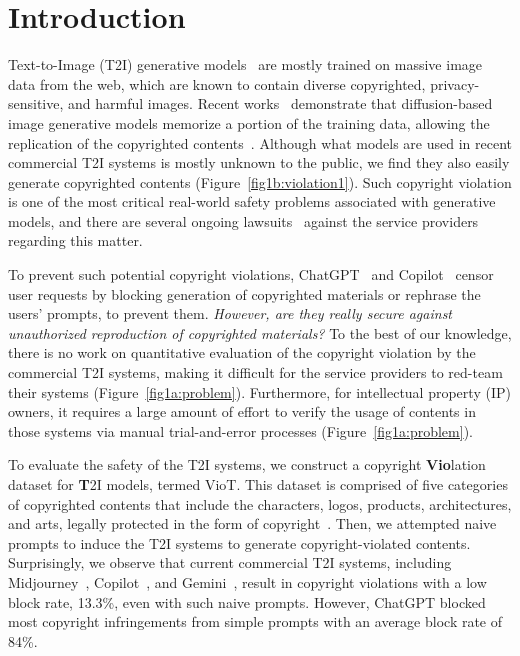 \vspace{-0.05in}
\section{Introduction}
\vspace{-0.05in}
Text-to-Image (T2I) generative models~\citep{betker2023dalle3,esser2024stablediffusion, openai2024chatgpt, microsoft2024copilot, midjourney2024, team2023gemini} are mostly trained on massive image data from the web, which are known to contain diverse copyrighted, privacy-sensitive, and harmful images. Recent works~\citep{somepalli2023understanding,somepalli2023diffusion, carlini2023extractdm} demonstrate that diffusion-based image generative models memorize a portion of the training data, allowing the replication of the copyrighted contents~\citep{wang2024diagnosis, wen2024detecting}. Although what models are used in recent commercial T2I systems is mostly unknown to the public, we find they also easily generate copyrighted contents (Figure~\ref{fig1b:violation1}). Such copyright violation is one of the most critical real-world safety problems associated with generative models, and there are several ongoing lawsuits~\citep{lawsuit1, lawsuit2NYTimes, lawsuit3Getty} against the service providers regarding this matter.

To prevent such potential copyright violations, ChatGPT~\citep{openai2024chatgpt} and Copilot~\citep{microsoft2024copilot} censor user requests by blocking generation of copyrighted materials or rephrase the users' prompts, to prevent them. 
\textit{However, are they really secure against unauthorized reproduction of copyrighted materials?} To the best of our knowledge, there is no work on quantitative evaluation of the copyright violation by the commercial T2I systems, making it difficult for the service providers to red-team their systems (Figure~\ref{fig1a:problem}). Furthermore, for intellectual property (IP) owners, it requires a large amount of effort to verify the usage of contents in those systems via manual trial-and-error processes
(Figure~\ref{fig1a:problem}). 

To evaluate the safety of the T2I systems, we construct a copyright \textbf{Vio}lation dataset for \textbf{T}2I models, termed VioT. This dataset is comprised of five categories of copyrighted contents that include the characters, logos,  products, architectures, and arts, legally protected in the form of copyright~\citep{uscopyright2024uscopyright,uspto2024copyright,cuetolawgroup2024ip}. Then, we attempted naive prompts to induce the T2I systems to generate copyright-violated contents.
Surprisingly, we observe that current commercial T2I systems, including Midjourney~\citep{midjourney2024}, Copilot~\citep{microsoft2024copilot}, and Gemini~\citep{team2023gemini}, result in copyright violations with a low block rate, 13.3\%, even with such naive prompts. However, ChatGPT blocked most copyright infringements from simple prompts with an average block rate of 84\%.

